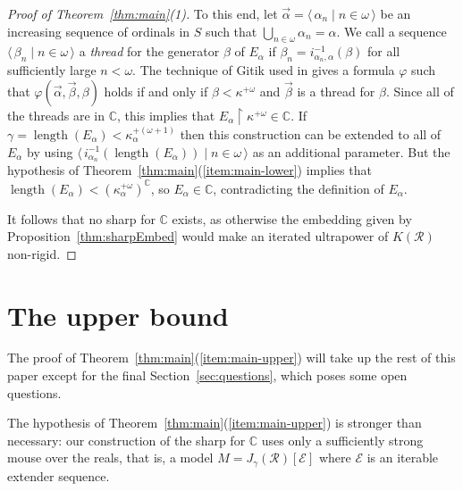 \documentclass[
twoside,
]{article}
\theoremstyle{definition}
\theoremstyle{remark}
\newcommand\reals{\mathcal{R}}
\newcommand{\RK}{K(\reals)}
\renewcommand{\phi}{\varphi}
\DeclareMathOperator{\len}{length}
\newcommand{\pair}[1]{\langle#1\rangle}
\newcommand{\seq}[1]{\pair{\,#1\,}}
\newcommand{\restrict}{{\upharpoonright}}
\newcommand\chang{\mathbb{C}}
\begin{document}
\begin{proof}[Proof of Theorem~\ref{thm:main}(1)]
  To this end, let  $\vec\alpha=\seq{\alpha_n\mid n\in\omega}$ be an increasing sequence of ordinals in $S$ such that $\bigcup_{n\in\omega}\alpha_n=\alpha$. We call a sequence $\seq{\beta_n\mid n\in\omega}$ a \emph{thread} for the generator $\beta$ of $E_\alpha$ if $\beta_n=i^{-1}_{\alpha_n,\alpha}(\beta)$ for all sufficiently large $n<\omega$.  
  The technique of Gitik used in \cite[Lemma~2.3]{gitik-mitchell.ext-indisc}  gives a formula $\phi$ such that $\phi(\vec\alpha,\vec\beta,\beta)$ holds if and only 
  if $\beta<\kappa^{+\omega}$ and $\vec\beta$ is a thread for $\beta$.
  Since all of the threads are in $\chang$, this implies that
  $E_\alpha\restrict\kappa^{+\omega}\in\chang$. If
  $\gamma=\len(E_\alpha)<\kappa_\alpha^{+(\omega+1)}$ then this
  construction can be extended to all of $E_\alpha$ by using
  $\seq{i^{-1}_{\alpha_n}(\len(E_\alpha))\mid n\in\omega}$ as an additional
  parameter.  
  But the hypothesis of Theorem~\ref{thm:main}(\ref{item:main-lower}) implies that
  $\len(E_\alpha)<(\kappa_\alpha^{+\omega})^\chang$, so
  $E_\alpha\in\chang$, contradicting the definition of $E_\alpha$. 
  
  It follows that no sharp for $\chang$ exists, as otherwise the embedding given
  by Proposition~\ref{thm:sharpEmbed}  would make an iterated ultrapower of $\RK$
  non-rigid. 
\end{proof}

\section{The upper bound}
\label{sec:upperbound}
The proof of Theorem~\ref{thm:main}(\ref{item:main-upper}) will take
up the rest of this paper except for the final 
Section~\ref{sec:questions}, which poses some open questions.

The hypothesis of Theorem~\ref{thm:main}(\ref{item:main-upper}) is stronger than
necessary:   our construction of the sharp for $\chang$  uses only a
sufficiently strong mouse  over the
reals, that is, a model  $M=J_{\gamma}(\reals)[\mathcal{E}]$ 
where $\mathcal{E}$ is an iterable extender sequence.  
\end{document}
